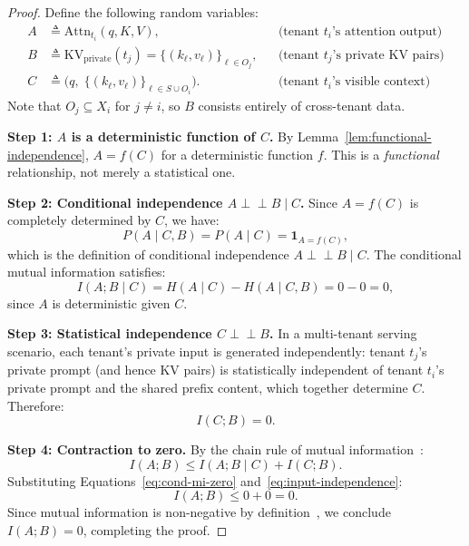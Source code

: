 \documentclass[11pt]{article}
\begin{document}
\begin{proof}
Define the following random variables:
\begin{align}
    A &\triangleq \mathrm{Attn}_{t_i}(q, K, V), &&\text{(tenant $t_i$'s attention output)} \\
    B &\triangleq \mathrm{KV}_{\mathrm{private}}(t_j) = \{(k_\ell, v_\ell)\}_{\ell \in O_j}, &&\text{(tenant $t_j$'s private KV pairs)} \\
    C &\triangleq \big(q,\; \{(k_\ell, v_\ell)\}_{\ell \in S \cup O_i}\big). &&\text{(tenant $t_i$'s visible context)}
\end{align}
Note that $O_j \subseteq X_i$ for $j \neq i$, so $B$ consists entirely of cross-tenant data.

\medskip
\noindent\textbf{Step 1: $A$ is a deterministic function of $C$.}
By Lemma~\ref{lem:functional-independence}, $A = f(C)$ for a deterministic function $f$.
This is a \emph{functional} relationship, not merely a statistical one.

\medskip
\noindent\textbf{Step 2: Conditional independence $A \perp\!\!\!\perp B \mid C$.}
Since $A = f(C)$ is completely determined by $C$, we have:
\begin{equation}
    P(A \mid C, B) = P(A \mid C) = \mathbf{1}_{A = f(C)},
\end{equation}
which is the definition of conditional independence $A \perp\!\!\!\perp B \mid C$.
The conditional mutual information satisfies:
\begin{equation}
    I(A; B \mid C) = H(A \mid C) - H(A \mid C, B) = 0 - 0 = 0,
    \label{eq:cond-mi-zero}
\end{equation}
since $A$ is deterministic given $C$.

\medskip
\noindent\textbf{Step 3: Statistical independence $C \perp\!\!\!\perp B$.}
In a multi-tenant serving scenario, each tenant's private input is generated independently:
tenant $t_j$'s private prompt (and hence KV pairs) is statistically independent of
tenant $t_i$'s private prompt and the shared prefix content, which together determine $C$.
Therefore:
\begin{equation}
    I(C; B) = 0.
    \label{eq:input-independence}
\end{equation}

\medskip
\noindent\textbf{Step 4: Contraction to zero.}
By the chain rule of mutual information~\cite{cover2006elements, shannon1948mathematical}:
\begin{equation}
    I(A; B) \leq I(A; B \mid C) + I(C; B).
\end{equation}
Substituting Equations~\eqref{eq:cond-mi-zero} and~\eqref{eq:input-independence}:
\begin{equation}
    I(A; B) \leq 0 + 0 = 0.
\end{equation}
Since mutual information is non-negative by definition~\cite{kraskov2004estimating}, we
conclude $I(A; B) = 0$, completing the proof.
\end{proof}
\end{document}
